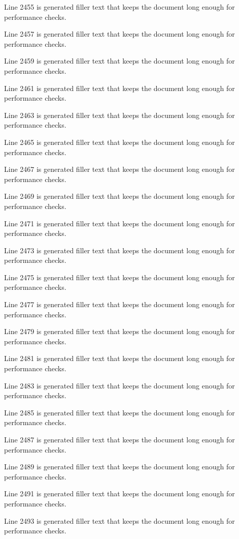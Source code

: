 Line 2455 is generated filler text that keeps the document long enough for performance checks.

Line 2457 is generated filler text that keeps the document long enough for performance checks.

Line 2459 is generated filler text that keeps the document long enough for performance checks.

Line 2461 is generated filler text that keeps the document long enough for performance checks.

Line 2463 is generated filler text that keeps the document long enough for performance checks.

Line 2465 is generated filler text that keeps the document long enough for performance checks.

Line 2467 is generated filler text that keeps the document long enough for performance checks.

Line 2469 is generated filler text that keeps the document long enough for performance checks.

Line 2471 is generated filler text that keeps the document long enough for performance checks.

Line 2473 is generated filler text that keeps the document long enough for performance checks.

Line 2475 is generated filler text that keeps the document long enough for performance checks.

Line 2477 is generated filler text that keeps the document long enough for performance checks.

Line 2479 is generated filler text that keeps the document long enough for performance checks.

Line 2481 is generated filler text that keeps the document long enough for performance checks.

Line 2483 is generated filler text that keeps the document long enough for performance checks.

Line 2485 is generated filler text that keeps the document long enough for performance checks.

Line 2487 is generated filler text that keeps the document long enough for performance checks.

Line 2489 is generated filler text that keeps the document long enough for performance checks.

Line 2491 is generated filler text that keeps the document long enough for performance checks.

Line 2493 is generated filler text that keeps the document long enough for performance checks.

